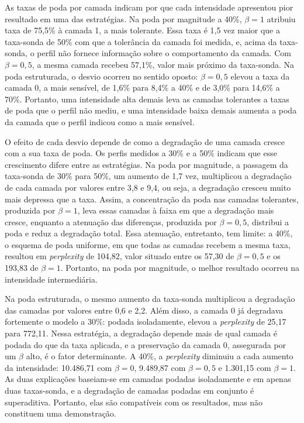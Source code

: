 As taxas de poda por camada indicam por que cada intensidade apresentou pior resultado em uma
das estratégias. Na poda por magnitude a 40\%, $\beta = 1$ atribuiu taxa de 75,5\% à camada 1,
a mais tolerante. Essa taxa é 1,5 vez maior que a taxa-sonda de 50\% com que a tolerância da
camada foi medida, e, acima da taxa-sonda, o perfil não fornece
informação sobre o comportamento da camada. Com $\beta = 0{,}5$, a mesma camada recebeu 57,1\%,
valor mais próximo da taxa-sonda. Na poda estruturada, o desvio ocorreu no sentido oposto:
$\beta = 0{,}5$ elevou a taxa da camada 0, a mais sensível, de
1,6\% para 8,4\% a 40\% e de 3,0\% para 14,6\% a 70\%. Portanto, uma intensidade alta demais
leva as camadas tolerantes a taxas de poda que o perfil não mediu, e uma intensidade baixa
demais aumenta a poda da camada que o perfil indicou como a mais sensível.

O efeito de cada desvio depende de como a degradação de uma camada cresce com a sua taxa de
poda. Os perfis medidos a 30\% e a 50\% indicam que esse
crescimento difere entre as estratégias. Na poda por magnitude, a passagem da taxa-sonda de
30\% para 50\%, um aumento de 1,7 vez, multiplicou a degradação de cada camada por valores
entre 3,8 e 9,4, ou seja, a degradação cresceu muito mais depressa que a taxa. Assim, a
concentração da poda nas camadas tolerantes, produzida por $\beta = 1$, leva essas camadas à
faixa em que a degradação mais cresce, enquanto a atenuação das diferenças, produzida por
$\beta = 0{,}5$, distribui a poda e reduz a degradação total. Essa atenuação, entretanto, tem
limite: a 40\%, o esquema de poda uniforme, em que todas as camadas recebem a mesma taxa,
resultou em \textit{perplexity} de 104,82, valor situado entre os 57,30 de $\beta = 0{,}5$ e os
193,83 de $\beta = 1$. Portanto, na poda por magnitude, o melhor resultado ocorreu na
intensidade intermediária.

Na poda estruturada, o mesmo aumento da taxa-sonda multiplicou a degradação das camadas por
valores entre 0,6 e 2,2. Além disso, a camada 0 já degradava fortemente o modelo a 30\%: podada
isoladamente, elevou a \textit{perplexity} de 25,17 para 772,11. Nessa estratégia, a degradação
depende mais de qual camada é podada do que da taxa aplicada, e a preservação da camada 0,
assegurada por um $\beta$ alto, é o fator determinante. A 40\%, a \textit{perplexity} diminuiu
a cada aumento da intensidade: 10.486,71 com $\beta = 0$, 9.489,87 com $\beta = 0{,}5$ e
1.301,15 com $\beta = 1$. As duas explicações baseiam-se em camadas podadas isoladamente e em
apenas duas taxas-sonda, e a degradação de camadas podadas em conjunto é superaditiva.
Portanto, elas são compatíveis com os resultados, mas
não constituem uma demonstração.


